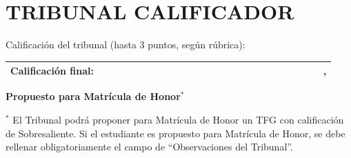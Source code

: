 \documentclass[11pt,a4paper,oneside]{article}
\begin{document}
\begin{description}
  \item[\expandafter\makefirstuc\expandafter{\wordTutorOrTutora}:] \myAcademicTutorFullName
        \ifthenelse{\equal{\myCoTutorFullName}{}}
        {
        }
        {
  \item[\expandafter\makefirstuc\expandafter{\wordCoTutorOrCoTutora}:] \myCoTutorFullName
        }
  \item[Departmento:] \DocumentDepartment

        \ifthenelse{\equal{\myCoTutorFullName}{}}
        {
  \item[Calificación \wordTutorDelOrDeLa{} \wordTutorOrTutora:] \myAcademicTutorGrade
      }
        {
  \item[Calificación \wordTutorDelOrDeLa{} \wordTutorOrTutora{} y \wordCoTutorDelOrDeLa{} \wordCoTutorOrCoTutora:] \myAcademicTutorGrade
          }
\end{description}


\section*{TRIBUNAL CALIFICADOR}

\begin{description}
  \item[Calificación del tribunal (hasta 3 puntos, según rúbrica):] \myTribunalGrade{}
\end{description}


\begin{table}[ht]
  \centering
  \begin{tabularx}{\textwidth}{|X|}
    \hline
    \vspace{-1mm}
    \textbf{Calificación final:}\newline
    \indent ~~~~~~~~~~~~~~~~~~~~~~~~~~~~~~~~~~~~~~~~   \myFinalGrade{}, \myFinalGradeName{}
    \vspace{1mm} \\ \hline
  \end{tabularx}
\end{table}

\noindent\textbf{Propuesto para Matrícula de Honor}$\mathbf{^{*}}$ ~~~~~~~~ \MHProposalBoxes{}

\noindent$^{*}$ El Tribunal podrá proponer para Matrícula de Honor un TFG con calificación de Sobresaliente. Si el estudiante es propuesto para Matrícula de Honor, se debe rellenar obligatoriamente el campo de ``Observaciones del Tribunal''.
\end{document}
